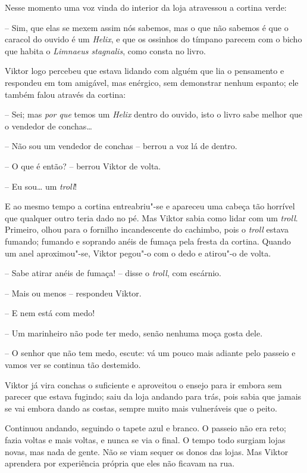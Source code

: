 Nesse momento uma voz vinda do interior da loja atravessou a cortina
verde:

-- Sim, que elas se mexem assim nós sabemos, mas o que não sabemos é que
o caracol do ouvido é um \textit{Helix}, e que os ossinhos do tímpano
parecem com o bicho que habita o \textit{Limnaeus stagnalis}, como
consta no livro.

Viktor logo percebeu que estava lidando com alguém que lia o pensamento
e respondeu em tom amigável, mas enérgico, sem demonstrar nenhum
espanto; ele também falou através da cortina:

-- Sei; mas \textit{por que }temos um \textit{Helix} dentro do ouvido,
isto o livro sabe melhor que o vendedor de conchas\ldots{}

-- Não sou um vendedor de conchas -- berrou a voz lá de dentro.

-- O que é então? -- berrou Viktor de volta.

-- Eu sou\ldots{} um \textit{troll}!

E ao mesmo tempo a cortina entreabriu"-se e apareceu uma cabeça tão
horrível que qualquer outro teria dado no pé. Mas Viktor sabia como
lidar com um \textit{troll}. Primeiro, olhou para o fornilho
incandescente do cachimbo, pois o \textit{troll} estava fumando;
fumando e soprando anéis de fumaça pela fresta da cortina. Quando um
anel aproximou"-se, Viktor pegou"-o com o dedo e atirou"-o de volta.

-- Sabe atirar anéis de fumaça! -- disse o \textit{troll}, com escárnio.

-- Mais ou menos -- respondeu Viktor.

-- E nem está com medo!

-- Um marinheiro não pode ter medo, senão nenhuma moça gosta dele.

-- O senhor que não tem medo, escute: vá um pouco mais adiante pelo
passeio e vamos ver se continua tão destemido.

Viktor já vira conchas o suficiente e aproveitou o ensejo para ir embora
sem parecer que estava fugindo; saiu da loja andando para trás, pois
sabia que jamais se vai embora dando as costas, sempre muito mais
vulneráveis que o peito. 

Continuou andando, seguindo o tapete azul e branco. O passeio não era
reto; fazia voltas e mais voltas, e nunca se via o final. O tempo todo
surgiam lojas novas, mas nada de gente. Não se viam sequer os donos das
lojas. Mas Viktor aprendera por experiência própria que eles não
ficavam na rua. 

